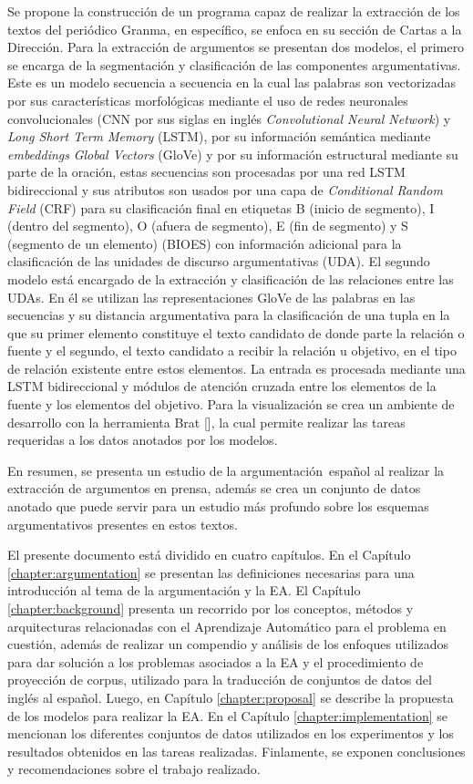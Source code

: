 Se propone la construcción de un programa capaz de realizar la extracción de los textos del periódico Granma, 
en específico, se enfoca en su sección de Cartas a la Dirección. Para la extracción
de argumentos se presentan dos modelos, el primero se encarga de la segmentación y clasificación
de las componentes argumentativas. Este es un modelo secuencia a secuencia en la cual las palabras 
son vectorizadas por sus características morfológicas mediante el uso de redes neuronales convolucionales
(CNN por sus siglas en inglés \emph{Convolutional Neural Network}) y \emph{Long Short Term Memory} (LSTM), por su información
semántica mediante \emph{embeddings} \emph{Global Vectors} (GloVe) y por su información 
estructural mediante su parte de la oración, estas 
secuencias son procesadas por una red LSTM bidireccional y sus atributos son usados por una capa 
de \emph{Conditional Random Field} (CRF) 
para su clasificación final en etiquetas B (inicio de segmento), I (dentro del segmento), O (afuera de segmento), 
E (fin de segmento) y S (segmento de un elemento) (BIOES) con información adicional para la clasificación de las 
unidades de discurso argumentativas (UDA). El segundo modelo está encargado de la extracción y clasificación 
de las relaciones entre las UDAs. En él se utilizan las representaciones GloVe de las palabras en las secuencias 
y su distancia argumentativa para la clasificación de una tupla en la que su primer elemento 
constituye el texto candidato de donde parte la relación o fuente y el segundo, el texto candidato a recibir la 
relación u objetivo, en el tipo de relación existente entre estos elementos. La entrada es procesada mediante 
una LSTM bidireccional y módulos de atención cruzada entre los elementos de la fuente y los elementos del objetivo.
Para la visualización se crea un ambiente de desarrollo con la herramienta Brat [\cite{brat}], la cual permite realizar las 
tareas requeridas a los datos anotados por los modelos.

En resumen, se presenta un estudio de la argumentación\ español al realizar la extracción de 
argumentos en prensa, además se crea un conjunto de datos anotado que puede servir
para un estudio más profundo sobre los esquemas argumentativos presentes en estos textos. 


El presente documento está dividido en cuatro capítulos.
En el Capítulo \ref{chapter:argumentation} se presentan las definiciones necesarias para una introducción
al tema de la argumentación y la EA.
El Capítulo \ref{chapter:background} presenta un recorrido por los 
conceptos, métodos y arquitecturas relacionadas con el Aprendizaje Automático para el problema 
en cuestión, además de realizar un compendio y análisis de los enfoques utilizados para dar solución
a los problemas asociados a la EA y el procedimiento de proyección de corpus, utilizado para la 
traducción de conjuntos de datos del inglés al español. 
Luego, en Capítulo \ref{chapter:proposal}
se describe la propuesta de los modelos para realizar la EA.
En el Capítulo \ref{chapter:implementation} se mencionan los diferentes conjuntos de datos utilizados 
en los experimentos y los resultados obtenidos en las tareas realizadas.
Finlamente, se exponen conclusiones y recomendaciones sobre el trabajo 
realizado.
